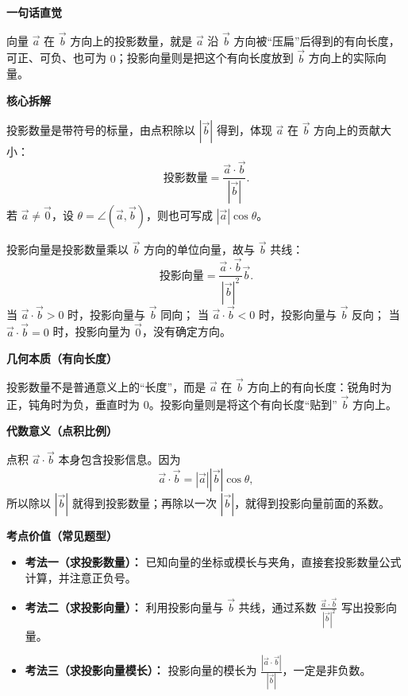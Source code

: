 \begin{explanationbox}
	\textbf{\textcolor{CExplanation}{一句话直觉}}

	向量 $\vec{a}$ 在 $\vec{b}$ 方向上的投影数量，就是 $\vec{a}$ 沿 $\vec{b}$ 方向被“压扁”后得到的有向长度，可正、可负、也可为 $0$；投影向量则是把这个有向长度放到 $\vec{b}$ 方向上的实际向量。

	\medskip
	\textbf{\textcolor{CExplanation}{核心拆解}}
	\begin{description}[style=nextline, leftmargin=2.8em, labelsep=0.5em, itemsep=0.45em]
		\item[\textbf{要点一（投影数量）：}] 投影数量是带符号的标量，由点积除以 $|\vec{b}|$ 得到，体现 $\vec{a}$ 在 $\vec{b}$ 方向上的贡献大小：
		      \[
			      \text{投影数量}=\frac{\vec{a}\cdot\vec{b}}{|\vec{b}|}.
		      \]
		      若 $\vec{a}\ne\vec{0}$，设 $\theta=\angle(\vec{a},\vec{b})$，则也可写成 $|\vec{a}|\cos\theta$。

		\item[\textbf{要点二（投影向量）：}] 投影向量是投影数量乘以 $\vec{b}$ 方向的单位向量，故与 $\vec{b}$ 共线：
		      \[
			      \text{投影向量}
			      =
			      \frac{\vec{a}\cdot\vec{b}}{|\vec{b}|^2}\vec{b}.
		      \]
		      当 $\vec{a}\cdot\vec{b}>0$ 时，投影向量与 $\vec{b}$ 同向；
		      当 $\vec{a}\cdot\vec{b}<0$ 时，投影向量与 $\vec{b}$ 反向；
		      当 $\vec{a}\cdot\vec{b}=0$ 时，投影向量为 $\vec{0}$，没有确定方向。
	\end{description}

	\medskip
	\textbf{\textcolor{CExplanation}{几何本质（有向长度）}}

	投影数量不是普通意义上的“长度”，而是 $\vec{a}$ 在 $\vec{b}$ 方向上的有向长度：锐角时为正，钝角时为负，垂直时为 $0$。投影向量则是将这个有向长度“贴到” $\vec{b}$ 方向上。

	\medskip
	\textbf{\textcolor{CExplanation}{代数意义（点积比例）}}

	点积 $\vec{a}\cdot\vec{b}$ 本身包含投影信息。因为
	\[
		\vec{a}\cdot\vec{b}=|\vec{a}||\vec{b}|\cos\theta,
	\]
	所以除以 $|\vec{b}|$ 就得到投影数量；再除以一次 $|\vec{b}|$，就得到投影向量前面的系数。

	\medskip
	\textbf{\textcolor{CExplanation}{考点价值（常见题型）}}
	\begin{itemize}[leftmargin=*, itemsep=0.5em, topsep=0.4em]
		\item \textbf{考法一（求投影数量）：} 已知向量的坐标或模长与夹角，直接套投影数量公式计算，并注意正负号。
		\item \textbf{考法二（求投影向量）：} 利用投影向量与 $\vec{b}$ 共线，通过系数 $\frac{\vec{a}\cdot\vec{b}}{|\vec{b}|^2}$ 写出投影向量。
		\item \textbf{考法三（求投影向量模长）：} 投影向量的模长为 $\frac{|\vec{a}\cdot\vec{b}|}{|\vec{b}|}$，一定是非负数。
	\end{itemize}


\end{explanationbox}
